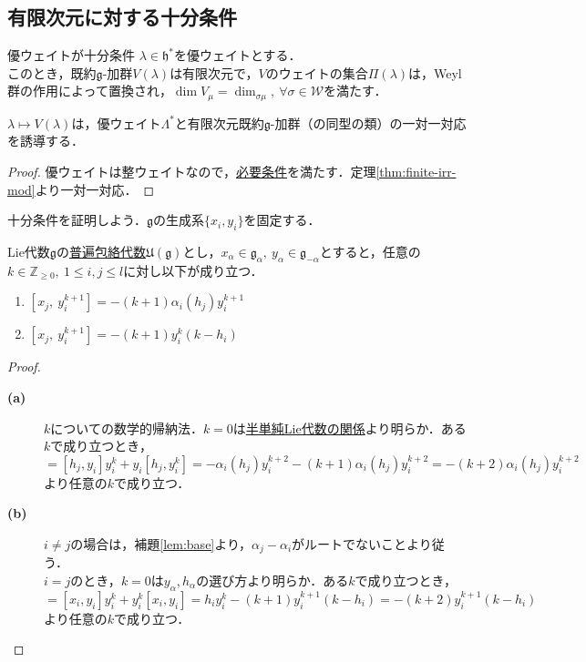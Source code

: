 \documentclass[rep_main]{subfiles}
\begin{document}
\subsection{有限次元に対する十分条件}
\begin{mytheo}[label=thm:suff-for-finite]{優ウェイトが十分条件}
	$\lambda \in \mathfrak{h}^*$を優ウェイトとする．\\
	このとき，既約$\mathfrak{g}$-加群$V(\lambda)$は有限次元で，$V$のウェイトの集合$\Pi(\lambda)$は，Weyl群の作用によって置換され，$\dim V_\mu = \dim_{\sigma\mu},\ \forall \sigma \in \mathscr{W}$を満たす．
\end{mytheo}
\begin{mycol}[label=col:suff-for-finite]{}
	$\lambda \mapsto V(\lambda)$は，優ウェイト$\Lambda^*$と有限次元既約$\mathfrak{g}$-加群（の同型の類）の一対一対応を誘導する．
\end{mycol}
\begin{proof}
	優ウェイトは整ウェイトなので，\hyperref[thm:necessary-for-finite]{必要条件}を満たす．定理\ref{thm:finite-irr-mod}より一対一対応．
\end{proof}
十分条件を証明しよう．$\mathfrak{g}$の生成系$\{x_i, y_i\}$を固定する．
\begin{mylem}[label=lem:suff-for-finite]{}
	Lie代数$\mathfrak{g}$の\hyperref[def:univ-env-alg]{普遍包絡代数}$\mathfrak{U}(\mathfrak{g})$とし，$x_\alpha \in \mathfrak{g}_\alpha,\ y_\alpha \in \mathfrak{g}_{-\alpha}$とすると，任意の$k \in \mathbb{Z}_{\geq 0},\ 1 \leq i, j \leq l$に対し以下が成り立つ．
	\begin{enumerate}
		\item $[x_j,\ y_i^{k+1}] = -(k+1)\alpha_i(h_j)y_i^{k+1}$
		\item $[x_j,\ y_i^{k+1}] = -(k+1)y_i^k(k - h_i)$
	\end{enumerate}
\end{mylem}
\begin{proof}
	\begin{description}
		\item[\textbf{(a)}] $k$についての数学的帰納法．$k=0$は\hyperref[prop:semisimple-Lie-alg-relation]{半単純Lie代数の関係}より明らか．ある$k$で成り立つとき，
		\begin{equation}
			[h_j, y_i^{k+1}] = [h_j, y_i]y_i^k + y_i[h_j, y_i^k] = -\alpha_i(h_j)y_i^{k+2} - (k+1)\alpha_i(h_j)y_i^{k+2} = - (k+2)\alpha_i(h_j)y_i^{k+2}
		\end{equation}
		より任意の$k$で成り立つ．
		\item[\textbf{(b)}] $i \neq j$の場合は，補題\ref{lem:base}より，$\alpha_j - \alpha_i$がルートでないことより従う．\\
		$i = j$のとき，$k = 0$は$y_\alpha, h_\alpha$の選び方より明らか．ある$k$で成り立つとき，
		\begin{equation}
			[x_i, y_i^{k+1}] = [x_i, y_i]y_i^k + y_i^k[x_i, y_i] = h_iy_i^k - (k+1)y_i^{k+1}(k - h_i) = -(k+2)y_i^{k+1}(k - h_i)
		\end{equation}
		より任意の$k$で成り立つ．
	\end{description}
\end{proof}
\end{document}
